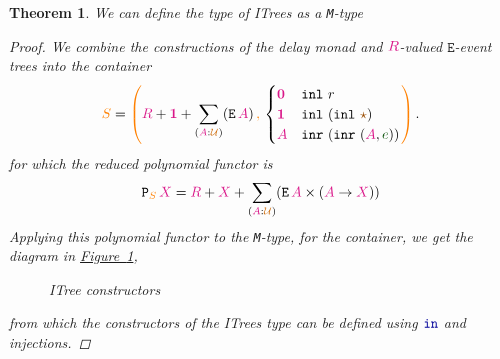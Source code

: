 \documentclass[twoside,11pt,openright]{report}
\theoremstyle{plain} %
\newtheorem{thm}{Theorem}[section]
\theoremstyle{definition}
\theoremstyle{remark}
\newcommand*{\figref}[1]{\hyperref[fig:#1]{Figure~\ref*{fig:#1}}}
\newcommand*{\term}[1]{\textcolor{green!30!black}{#1}} %
\newcommand*{\type}[1]{\textcolor{magenta!90!black}{#1}}
\newcommand*{\container}[1]{\textcolor{orange}{#1}}
\newcommand*{\containerpair}[2]{\ensuremath{\colorlet{savedleftcolor}{.}\color{orange}\left(\color{savedleftcolor}#1\,\textcolor{orange}{\mathbf{,}}\,#2\color{orange}\right)\color{savedleftcolor}}}
\newcommand*{\universe}[1]{\textcolor{orange!80!black}{#1}}
\newcommand*{\unit}{\type{\textbf{1}}}
\newcommand*{\empt}{\type{\textbf{0}}}
\newcommand*{\constant}[1]{\textcolor{orange!60!black}{\ensuremath{\mathtt{#1}}}}
\newcommand*{\function}[1]{\textcolor{blue!60!black}{\ensuremath{\mathtt{#1}}}}
\newcommand*{\constructor}[1]{\textcolor{purple!60!black}{\ensuremath{\mathtt{#1}}}}
\newcommand*{\typeformer}[1]{\ensuremath{\mathtt{#1}}}
\newcommand*{\functor}[1]{\ensuremath{\mathbf{\mathtt{#1}}}}
\newcommand*{\unitelem}{\constant{\star}} %
\begin{document}
\begin{thm}
  We can define the type of ITrees as a \texttt{M}-type
  \begin{proof}
    We combine the constructions of the delay monad and \(\type{R}\)-valued \(\typeformer{E}\)-event trees into the container
    \begin{equation}
      \container{S} = \containerpair{\type{R}+\unit+\sum_{(\type{A}:\universe{\mathcal{U}})} (\typeformer{E}\,\type{A})}{\begin{cases} \empt & \texttt{inl}~r \\ \unit & \texttt{inl}~(\texttt{inl}~\unitelem) \\ \type{A} & \texttt{inr}~(\texttt{inr}~(\type{A},\term{e})) \end{cases}}.
    \end{equation}
    \noindent for which the reduced polynomial functor is
    \begin{equation}
      \functor{P}_{\container{S}}\,\type{X} = \type{R} + \type{X} + \sum_{(\type{A} : \universe{\mathcal{U}})} (\typeformer{E}\,\type{A} \times (\type{A} \rightarrow \type{X}))
    \end{equation}
    Applying this polynomial functor to the \texttt{M}-type, for the container, we get the diagram in \figref{ITree-constructors},
    \begin{figure}[h]
      \centering
      \caption{ITree constructors}
      \label{fig:ITree-constructors}
    \end{figure}
    from which the constructors of the ITrees type can be defined using \(\function{in}\) and injections.
  \end{proof}
\end{thm}
\end{document}
